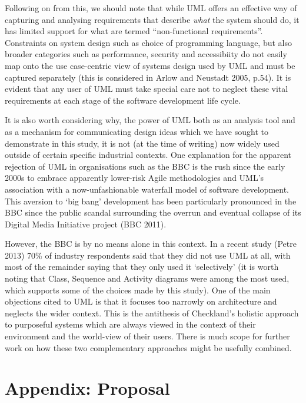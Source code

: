 \documentclass[a4paper]{article}
\begin{document}
Following on from this, we should note that while UML offers an effective way of capturing and analysing requirements that describe \textit{what} the system should do, it has limited support for what are termed ``non-functional requirements''. Constraints on system design such as choice of programming language, but also broader categories such as performance, security and accessibiity do not easily map onto the use case-centric view of systems design used by UML and must be captured separately (this is considered in Arlow and Neustadt 2005, p.54). It is evident that any user of UML must take special care not to neglect these vital requirements at each stage of the software development life cycle.

It is also worth considering why, the power of UML both as an analysis tool and as a mechanism for communicating design ideas which we have sought to demonstrate in this study, it is not (at the time of writing) now widely used outside of certain specific industrial contexts. One explanation for the apparent rejection of UML in organisations such as the BBC is the rush since the early 2000s to embrace apparently lower-risk Agile methodologies and UML's association with a now-unfashionable waterfall model of software development. This aversion to `big bang' development has been particularly pronounced in the BBC since the public scandal surrounding the overrun and eventual collapse of its Digital Media Initiative project (BBC 2011).

However, the BBC is by no means alone in this context. In a recent study (Petre 2013) 70\% of industry respondents said that they did not use UML at all, with most of the remainder saying that they only used it `selectively' (it is worth noting that Class, Sequence and Activity diagrams were among the most used, which supports some of the choices made by this study). One of the main objections cited to UML is that it focuses too narrowly on architecture and neglects the wider context. This is the antithesis of Checkland's holistic approach to purposeful systems which are always viewed in the context of their environment and the world-view of their users. There is much scope for further work on how these two complementary approaches might be usefully combined.


\clearpage

\section{Appendix: Proposal}
\end{document}
